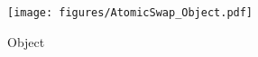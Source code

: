 \begin{figure}[H]
    \centering
    \texttt{[image: figures/AtomicSwap\_Object.pdf]}
    \caption{\AtomicSwap{} Object}
\end{figure}
